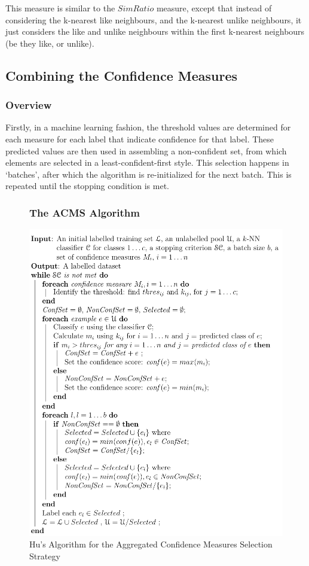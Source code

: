 \documentclass[a4paper,11pt]{report}
\begin{document}
This measure is similar to the $SimRatio$ measure, except that instead of considering the k-nearest like neighbours, and the k-nearest unlike neighbours, it just considers the like and unlike neighbours within the first k-nearest neighbours (be they like, or unlike).

\subsection{Combining the Confidence Measures}

\subsubsection{Overview}
Firstly, in a machine learning fashion, the threshold values are determined for each measure for each label that indicate confidence for that label. These predicted values are then used in assembling a non-confident set, from which elements are selected in a least-confident-first style. This selection happens in `batches', after which the algorithm is re-initialized for the next batch. This is repeated until the stopping condition is met.

\begin{figure}[h!] 
\subsubsection{The ACMS Algorithm}
\centering
\includegraphics[scale=0.7]{./Others/Hu2011AggregrateAlgorithm}
\caption*{Hu's Algorithm for the Aggregated Confidence Measures Selection Strategy}
\end{figure}
\end{document}
